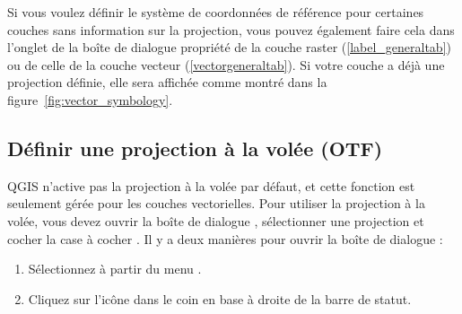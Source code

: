 Si vous voulez définir le système de coordonnées de référence pour certaines
couches sans information sur la projection, vous pouvez également faire cela
dans l'onglet  de la boîte de dialogue propriété de la couche
raster (\ref{label_generaltab}) ou de celle de la couche vecteur
(\ref{vectorgeneraltab}). Si votre couche a déjà une projection définie, elle
sera affichée comme montré dans la figure~\ref{fig:vector_symbology}.

\subsection{Définir une projection à la volée (OTF)}\label{label_projstart}

QGIS n'active pas la projection à la volée par défaut, et cette fonction est
seulement gérée pour les couches vectorielles. Pour utiliser la projection à la
volée, vous devez ouvrir la boîte de dialogue
, sélectionner une
projection et cocher la case à cocher . Il y a deux manières pour ouvrir la boîte de dialogue :

\begin{enumerate}
\item Sélectionnez  à partir du menu .
\item Cliquez sur l'icône  dans
le coin en base à droite de la barre de statut.
\end{enumerate}

